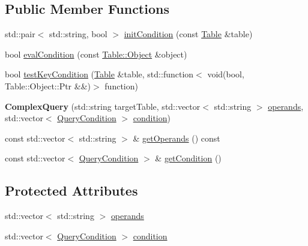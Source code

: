 \subsection*{Public Member Functions}
\begin{DoxyCompactItemize}
\item 
std\+::pair$<$ std\+::string, bool $>$ \hyperlink{class_complex_query_af4a16c28edc5ecc3631ef528349279af}{init\+Condition} (const \hyperlink{class_table}{Table} \&table)
\item 
bool \hyperlink{class_complex_query_ae6d00834afbcbe7322b5d7c2fee11e1e}{eval\+Condition} (const \hyperlink{class_table_1_1_object_impl}{Table\+::\+Object} \&object)
\item 
bool \hyperlink{class_complex_query_a111c6bb74ca841541a89c68c4e6a641f}{test\+Key\+Condition} (\hyperlink{class_table}{Table} \&table, std\+::function$<$ void(bool, Table\+::\+Object\+::\+Ptr \&\&)$>$ function)
\item 
\mbox{\label{class_complex_query_a5988043a8ce728b0d7740706c5cac9fd}} 
{\bfseries Complex\+Query} (std\+::string target\+Table, std\+::vector$<$ std\+::string $>$ \hyperlink{class_complex_query_a00f38ae7b87fefa8668d7bac95addd94}{operands}, std\+::vector$<$ \hyperlink{struct_query_condition}{Query\+Condition} $>$ \hyperlink{class_complex_query_ac65a30ad8b99278b03d6a64ad34a8a75}{condition})
\item 
const std\+::vector$<$ std\+::string $>$ \& \hyperlink{class_complex_query_a8b01ad18d858402ac96ab83e85e5198f}{get\+Operands} () const
\item 
const std\+::vector$<$ \hyperlink{struct_query_condition}{Query\+Condition} $>$ \& \hyperlink{class_complex_query_a675cc1fc7bbecf1c92698171131fd3c1}{get\+Condition} ()
\end{DoxyCompactItemize}
\subsection*{Protected Attributes}
\begin{DoxyCompactItemize}
\item 
std\+::vector$<$ std\+::string $>$ \hyperlink{class_complex_query_a00f38ae7b87fefa8668d7bac95addd94}{operands}
\item 
std\+::vector$<$ \hyperlink{struct_query_condition}{Query\+Condition} $>$ \hyperlink{class_complex_query_ac65a30ad8b99278b03d6a64ad34a8a75}{condition}
\end{DoxyCompactItemize}


